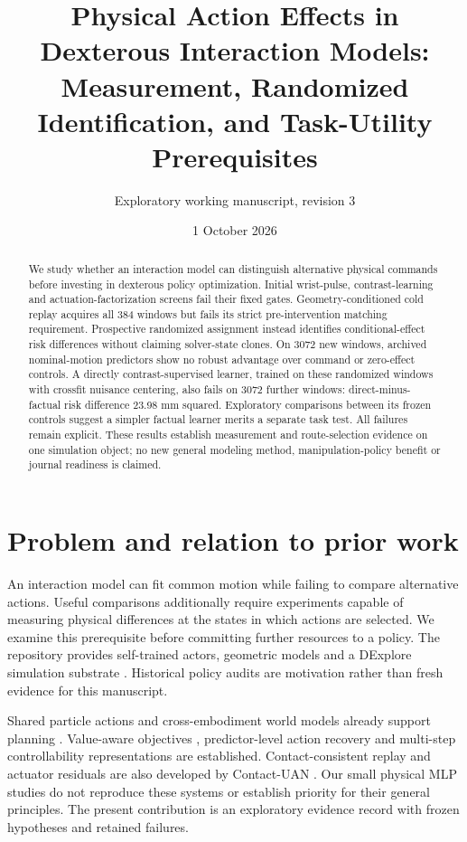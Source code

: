 \documentclass[10pt]{article}
\title{Physical Action Effects in Dexterous Interaction Models:\\Measurement, Randomized Identification, and Task-Utility Prerequisites}
\author{Exploratory working manuscript, revision 3}
\date{1 October 2026}
\begin{document}
\maketitle
\begin{abstract}
We study whether an interaction model can distinguish alternative physical
commands before investing in dexterous policy optimization. Initial wrist-pulse,
contrast-learning and actuation-factorization screens fail their fixed gates.
Geometry-conditioned cold replay acquires all 384 windows but fails its strict
pre-intervention matching requirement. Prospective randomized assignment instead
identifies conditional-effect risk differences without claiming solver-state clones.
On 3072 new windows, archived nominal-motion predictors show no robust advantage
over command or zero-effect controls. A directly contrast-supervised learner,
trained on these randomized windows with crossfit nuisance centering, also fails
on 3072 further windows: direct-minus-factual risk difference 23.98 mm squared.
Exploratory comparisons between its frozen controls suggest a simpler factual
learner merits a separate task test. All failures remain explicit. These results
establish measurement and route-selection evidence on one simulation object;
no new general modeling method, manipulation-policy benefit or journal readiness
is claimed.
\end{abstract}

\section{Problem and relation to prior work}
An interaction model can fit common motion while failing to compare alternative actions.
Useful comparisons additionally require experiments capable of measuring physical
differences at the states in which actions are selected. We examine this prerequisite
before committing further resources to a policy. The repository provides self-trained
actors, geometric models and a DExplore simulation substrate \cite{xu2025}. Historical
policy audits are motivation rather than fresh evidence for this manuscript.

Shared particle actions and cross-embodiment world models already support planning
\cite{he2025}. Value-aware objectives \cite{farahmand2017}, predictor-level action
recovery \cite{qiu2026} and multi-step controllability representations \cite{rudolph2024}
are established. Contact-consistent replay and actuator residuals are also developed
by Contact-UAN \cite{fey2026}. Our small physical MLP studies do not reproduce these
systems or establish priority for their general principles. The present contribution
is an exploratory evidence record with frozen hypotheses and retained failures.
\end{document}
